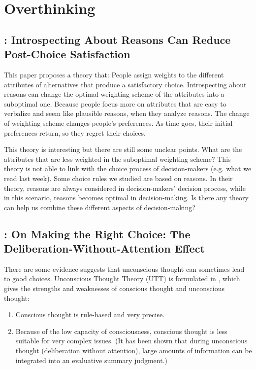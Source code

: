 \documentclass[11pt]{elegantbook}
\begin{document}
\chapter{Overthinking}
\section{\cite{wilson1993introspecting}: Introspecting About Reasons Can Reduce Post-Choice Satisfaction}
This paper proposes a theory that: People assign weights to the different attributes of alternatives that produce a satisfactory choice. Introspecting about reasons can change the optimal weighting scheme of the attributes into a suboptimal one. Because people focus more on attributes that are easy to verbalize and seem like plausible reasons, when they analyze reasons. The change of weighting scheme changes people's preferences. As time goes, their initial preferences return, so they regret their choices.

This theory is interesting but there are still some unclear points. What are the attributes that are less weighted in the suboptimal weighting scheme? This theory is not able to link with the choice process of decision-makers (e.g. what we read last week). Some choice rules we studied are based on reasons. In their theory, reasons are always considered in decision-makers' decision process, while in this scenario, reasons becomes optimal in decision-making. Is there any theory can help us combine these different aspects of decision-making?

\section{\cite{dijksterhuis2006making}: On Making the Right Choice: The Deliberation-Without-Attention Effect}
There are some evidence suggests that unconscious thought can sometimes lead to good choices. Unconscious Thought Theory (UTT) is formulated in \cite{dijksterhuis2006theory}, which gives the strengths and weaknesses of conscious thought and unconscious thought:
\begin{enumerate}
    \item Conscious thought is rule-based and very precise.
    \item Because of the low capacity of consciousness, conscious thought is less suitable for very complex issues. (It has been shown that during unconscious thought (deliberation without attention), large amounts of information can be integrated into an evaluative summary judgment.)
\end{enumerate}
\end{document}

